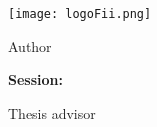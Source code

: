 \begin{titlepage}
    \begin{center}
        \large
        \MakeUppercase{\university}
        
        \LARGE
        \textbf{\MakeUppercase{\faculty}}
        
        \vspace{1cm}
        \texttt{[image: logoFii.png]}
        
        \vspace{1cm}
        \Large
        \MakeUppercase{\thesistype}
        
        \vspace{0.5cm}
        \LARGE
        \textbf{\thesistitle}
        
        \vspace{2cm}
        \Large
        Author
        
        \vspace{0.5cm}
        \LARGE
        \textbf{\authornamefl}
        
        \vfill
        \Large
        \textbf{Session:} \session
        
        \vspace{2cm}
        \Large
        Thesis advisor
        
        \vspace{0.5cm}
        \LARGE
        \textbf{\coordinator}
    \end{center}
\end{titlepage}